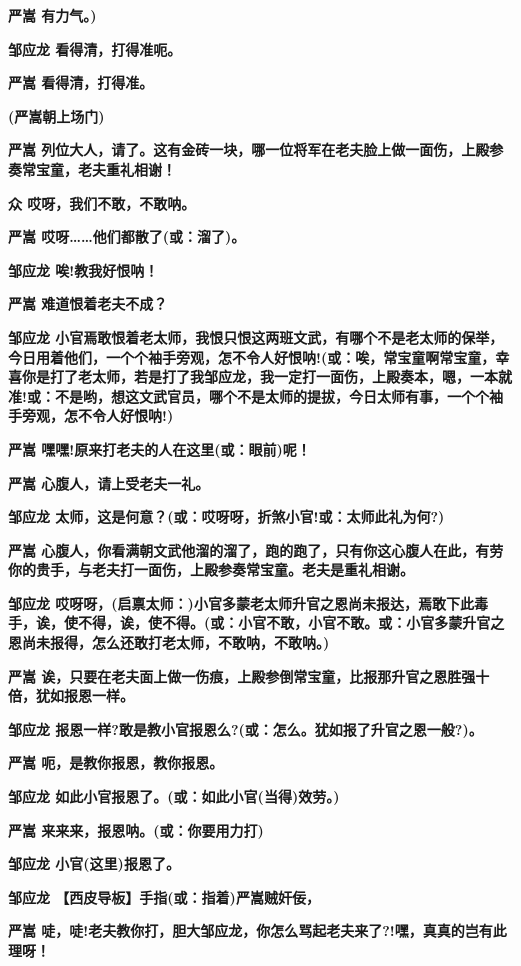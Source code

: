 \textbf{严嵩 有力气。)}

\textbf{邹应龙 看得清，打得准呃。}

\textbf{严嵩 看得清，打得准。}

\textbf{(严嵩朝上场门)}

\textbf{严嵩
列位大人，请了。这有金砖一块，哪一位将军在老夫脸上做一面伤，上殿参奏常宝童，老夫重礼相谢！}

\textbf{众 哎呀，我们不敢，不敢呐。}

\textbf{严嵩 哎呀\ldots{}\ldots{}他们都散了(或：溜了)。}

\textbf{邹应龙 唉!教我好恨呐！}

\textbf{严嵩 难道恨着老夫不成？}

\textbf{邹应龙
小官焉敢恨着老太师，我恨只恨这两班文武，有哪个不是老太师的保举，今日用着他们，一个个袖手旁观，怎不令人好恨呐!(或：唉，常宝童啊常宝童，幸喜你是打了老太师，若是打了我邹应龙，我一定打一面伤，上殿奏本，嗯，一本就准!或：不是哟，想这文武官员，哪个不是太师的提拔，今日太师有事，一个个袖手旁观，怎不令人好恨呐!)}

\textbf{严嵩 嘿嘿!原来打老夫的人在这里(或：眼前)呢！}

\textbf{严嵩 心腹人，请上受老夫一礼。}

\textbf{邹应龙 太师，这是何意？(或：哎呀呀，折煞小官!或：太师此礼为何?)}

\textbf{严嵩
心腹人，你看满朝文武他溜的溜了，跑的跑了，只有你这心腹人在此，有劳你的贵手，与老夫打一面伤，上殿参奏常宝童。老夫是重礼相谢。}

\textbf{邹应龙
哎呀呀，(启禀太师：)小官多蒙老太师升官之恩尚未报达，焉敢下此毒手，诶，使不得，诶，使不得。(或：小官不敢，小官不敢。或：小官多蒙升官之恩尚未报得，怎么还敢打老太师，不敢呐，不敢呐。)}

\textbf{严嵩
诶，只要在老夫面上做一伤痕，上殿参倒常宝童，比报那升官之恩胜强十倍，犹如报恩一样。}

\textbf{邹应龙
报恩一样?敢是教小官报恩么?(或：怎么。犹如报了升官之恩一般?)。}

\textbf{严嵩 呃，是教你报恩，教你报恩。}

\textbf{邹应龙 如此小官报恩了。(或：如此小官(当得)效劳。)}

\textbf{严嵩 来来来，报恩呐。(或：你要用力打)}

\textbf{邹应龙 小官(这里)报恩了。}

\textbf{邹应龙 【西皮导板】手指(或：指着)严嵩贼奸佞，}

\textbf{严嵩
唗，唗!老夫教你打，胆大邹应龙，你怎么骂起老夫来了?!嘿，真真的岂有此理呀！}

